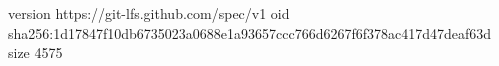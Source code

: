 version https://git-lfs.github.com/spec/v1
oid sha256:1d17847f10db6735023a0688e1a93657ccc766d6267f6f378ac417d47deaf63d
size 4575
